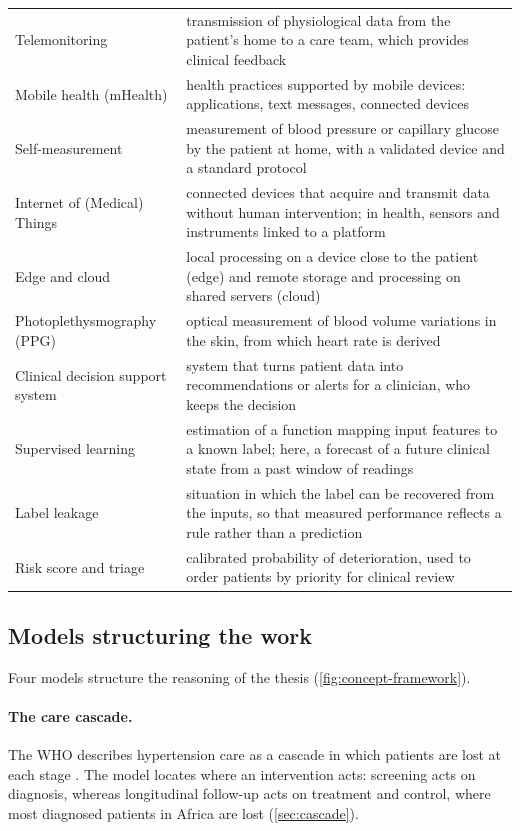 \begin{table}[htbp]
\begin{tabularx}{\textwidth}{@{}>{\raggedright\arraybackslash}p{3.3cm} X@{}}
Telemonitoring & transmission of physiological data from the patient's home to a care team, which provides clinical feedback \\
Mobile health (mHealth) & health practices supported by mobile devices: applications, text messages, connected devices \\
Self-measurement & measurement of blood pressure or capillary glucose by the patient at home, with a validated device and a standard protocol \\
Internet of (Medical) Things & connected devices that acquire and transmit data without human intervention; in health, sensors and instruments linked to a platform \\
Edge and cloud & local processing on a device close to the patient (edge) and remote storage and processing on shared servers (cloud) \\
Photoplethysmography (PPG) & optical measurement of blood volume variations in the skin, from which heart rate is derived \\
Clinical decision support system & system that turns patient data into recommendations or alerts for a clinician, who keeps the decision \\
Supervised learning & estimation of a function mapping input features to a known label; here, a forecast of a future clinical state from a past window of readings \\
Label leakage & situation in which the label can be recovered from the inputs, so that measured performance reflects a rule rather than a prediction \\
Risk score and triage & calibrated probability of deterioration, used to order patients by priority for clinical review \\
\bottomrule
\end{tabularx}
\end{table}

\subsection{Models structuring the work}\label{sec:models}

Four models structure the reasoning of the thesis (\cref{fig:concept-framework}).

\paragraph{The care cascade.} The WHO describes hypertension care as a cascade in which patients are lost at each stage \parencite{who2023hypertension}. The model locates where an intervention acts: screening acts on diagnosis, whereas longitudinal follow-up acts on treatment and control, where most diagnosed patients in Africa are lost (\cref{sec:cascade}).

